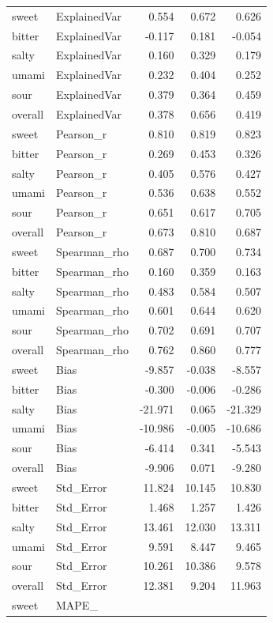 \begin{tabular}{llrrr}
sweet & ExplainedVar & 0.554 & 0.672 & 0.626 \\
bitter & ExplainedVar & -0.117 & 0.181 & -0.054 \\
salty & ExplainedVar & 0.160 & 0.329 & 0.179 \\
umami & ExplainedVar & 0.232 & 0.404 & 0.252 \\
sour & ExplainedVar & 0.379 & 0.364 & 0.459 \\
overall & ExplainedVar & 0.378 & 0.656 & 0.419 \\
sweet & Pearson_r & 0.810 & 0.819 & 0.823 \\
bitter & Pearson_r & 0.269 & 0.453 & 0.326 \\
salty & Pearson_r & 0.405 & 0.576 & 0.427 \\
umami & Pearson_r & 0.536 & 0.638 & 0.552 \\
sour & Pearson_r & 0.651 & 0.617 & 0.705 \\
overall & Pearson_r & 0.673 & 0.810 & 0.687 \\
sweet & Spearman_rho & 0.687 & 0.700 & 0.734 \\
bitter & Spearman_rho & 0.160 & 0.359 & 0.163 \\
salty & Spearman_rho & 0.483 & 0.584 & 0.507 \\
umami & Spearman_rho & 0.601 & 0.644 & 0.620 \\
sour & Spearman_rho & 0.702 & 0.691 & 0.707 \\
overall & Spearman_rho & 0.762 & 0.860 & 0.777 \\
sweet & Bias & -9.857 & -0.038 & -8.557 \\
bitter & Bias & -0.300 & -0.006 & -0.286 \\
salty & Bias & -21.971 & 0.065 & -21.329 \\
umami & Bias & -10.986 & -0.005 & -10.686 \\
sour & Bias & -6.414 & 0.341 & -5.543 \\
overall & Bias & -9.906 & 0.071 & -9.280 \\
sweet & Std_Error & 11.824 & 10.145 & 10.830 \\
bitter & Std_Error & 1.468 & 1.257 & 1.426 \\
salty & Std_Error & 13.461 & 12.030 & 13.311 \\
umami & Std_Error & 9.591 & 8.447 & 9.465 \\
sour & Std_Error & 10.261 & 10.386 & 9.578 \\
overall & Std_Error & 12.381 & 9.204 & 11.963 \\
sweet & MAPE_%

\end{tabular}
